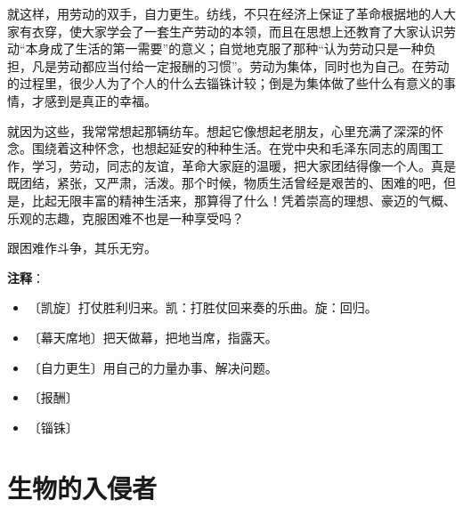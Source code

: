 \documentclass[12pt,UTF-8,openany]{ctexbook}
\begin{document}
\begin{normalsize}
    就这样，用劳动的双手，自力更生。纺线，不只在经济上保证了革命根据地的人大家有衣穿，使大家学会了一套生产劳动的本领，而且在思想上还教育了大家认识劳动“本身成了生活的第一需要”的意义；自觉地克服了那种“认为劳动只是一种负担，凡是劳动都应当付给一定报酬的习惯”。劳动为集体，同时也为自己。在劳动的过程里，很少人为了个人的什么去锱铢计较；倒是为集体做了些什么有意义的事情，才感到是真正的幸福。
    
    就因为这些，我常常想起那辆纺车。想起它像想起老朋友，心里充满了深深的怀念。围绕着这种怀念，也想起延安的种种生活。在党中央和毛泽东同志的周围工作，学习，劳动，同志的友谊，革命大家庭的温暖，把大家团结得像一个人。真是既团结，紧张，又严肃，活泼。那个时候，物质生活曾经是艰苦的、困难的吧，但是，比起无限丰富的精神生活来，那算得了什么！凭着崇高的理想、豪迈的气概、乐观的志趣，克服困难不也是一种享受吗？
    
    跟困难作斗争，其乐无穷。
    
\end{normalsize}


\newpage

\textbf{注释}：

\vspace{-1em}

\begin{itemize}
    \setlength\itemsep{-0.2em}
    \item 〔凯旋〕打仗胜利归来。凯：打胜仗回来奏的乐曲。旋：回归。
    \item 〔幕天席地〕把天做幕，把地当席，指露天。
    \item 〔自力更生〕用自己的力量办事、解决问题。
    \item 〔报酬〕
    \item 〔锱铢〕
\end{itemize}

\chapter{生物的入侵者}
\end{document}

